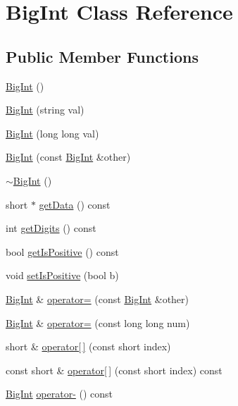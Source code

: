 \hypertarget{class_big_int}{}\section{Big\+Int Class Reference}
\label{class_big_int}
\subsection*{Public Member Functions}
\begin{DoxyCompactItemize}
\item 
\hyperlink{class_big_int_af677021c0987fc2a48da06837ed29c58}{Big\+Int} ()
\item 
\hyperlink{class_big_int_acebc402885a73f93cc50c0e7c07e0c1e}{Big\+Int} (string val)
\item 
\hyperlink{class_big_int_af2d9aed1aeff8bcb1a1d7a59add76a2c}{Big\+Int} (long long val)
\item 
\hyperlink{class_big_int_a35bd468d1f1b248fa8601e98d9e28095}{Big\+Int} (const \hyperlink{class_big_int}{Big\+Int} \&other)
\item 
\hyperlink{class_big_int_a2a8ffad37329b0a3649b88180406d12c}{$\sim$\+Big\+Int} ()
\item 
short $\ast$ \hyperlink{class_big_int_a380fe234cd3ea95706affc020b2493a4}{get\+Data} () const 
\item 
int \hyperlink{class_big_int_acf4f158035d5001cd102fc0b14b5d22d}{get\+Digits} () const 
\item 
bool \hyperlink{class_big_int_a4e870e916d8b09c0ad62cfa7f2ba8de0}{get\+Is\+Positive} () const 
\item 
void \hyperlink{class_big_int_a6bb113748317085a1c8e111fadeec13e}{set\+Is\+Positive} (bool b)
\item 
\hyperlink{class_big_int}{Big\+Int} \& \hyperlink{class_big_int_acf92dcbd39a0698cb36bf2cf65fefa7e}{operator=} (const \hyperlink{class_big_int}{Big\+Int} \&other)
\item 
\hyperlink{class_big_int}{Big\+Int} \& \hyperlink{class_big_int_aba3cbd0f26009a452359f779742659bb}{operator=} (const long long num)
\item 
short \& \hyperlink{class_big_int_acb6c7b1b053887bff5673f9cbd5833a6}{operator\mbox{[}$\,$\mbox{]}} (const short index)
\item 
const short \& \hyperlink{class_big_int_a5483010354528bf73d933cd36c5da11b}{operator\mbox{[}$\,$\mbox{]}} (const short index) const 
\item 
\hyperlink{class_big_int}{Big\+Int} \hyperlink{class_big_int_a56350bc8395ed38c2afdbb4554e56b1f}{operator-\/} () const 

\end{DoxyCompactItemize}
